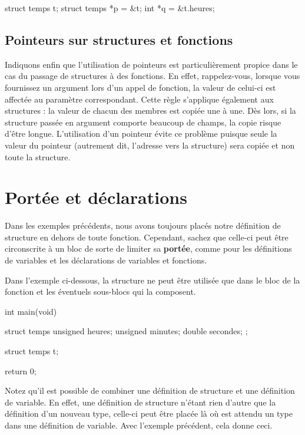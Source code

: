 \begin{C}
struct temps t;
struct temps *p = &t;
int *q = &t.heures;
\end{C}

\subsection{Pointeurs sur structures et fonctions}
\label{pointeurs-sur-structures-et-fonctions}

Indiquons enfin que l'utilisation de pointeurs est particulièrement
propice dans le cas du passage de structures à des fonctions. En effet,
rappelez-vous, lorsque vous fournissez un argument lors d'un appel de
fonction, la valeur de celui-ci est affectée au paramètre correspondant.
Cette règle s'applique également aux structures : la valeur de chacun
des membres est copiée une à une. Dès lors, si la structure passée en
argument comporte beaucoup de champs, la copie risque d'être longue.
L'utilisation d'un pointeur évite ce problème puisque seule la valeur du
pointeur (autrement dit, l'adresse vers la structure) sera copiée et non
toute la structure.

\section{Portée et déclarations}
\label{portee-et-declarations}

Dans les exemples précédents, nous avons toujours placés notre
définition de structure en dehors de toute fonction. Cependant, sachez
que celle-ci peut être circonscrite à un bloc de sorte de limiter sa
\textbf{portée}, comme pour les définitions de variables et les
déclarations de variables et fonctions.

Dans l'exemple ci-dessous, la structure  ne peut être
utilisée que dans le bloc de la fonction  et les
éventuels sous-blocs qui la composent.

\begin{C}
int main(void)
{
    struct temps {
        unsigned heures;
        unsigned minutes;
        double secondes;
    };

    struct temps t;

    return 0;
}
\end{C}

Notez qu'il est possible de combiner une définition de structure et une
définition de variable. En effet, une définition de structure n'étant
rien d'autre que la définition d'un nouveau type, celle-ci peut être
placée là où est attendu un type dans une définition de variable. Avec
l'exemple précédent, cela donne ceci.

